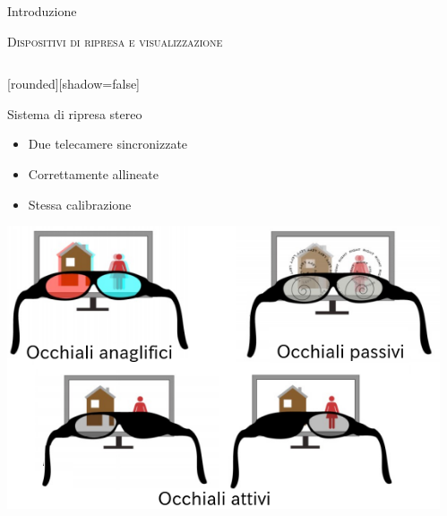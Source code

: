 \documentclass{beamer}
\begin{document}
\begin{section}{Introduzione}
\begin{frame}[t]{\textsc{Dispositivi di ripresa e visualizzazione}}
\begin{columns}
\begin{column}{5cm}
\begin{center}
[rounded][shadow=false]
\begin{block}{Sistema di ripresa stereo}
		\begin{itemize}
			\item  \small{Due telecamere sincronizzate}
			\item \small{Correttamente allineate}
			\item \small{Stessa calibrazione}
		\end{itemize}	
	\end{block}
\end{center}
\centering
\includegraphics[width=1\linewidth]{./img/display.png}
\end{column}

\begin{column}{5cm}


\end{column}
\end{columns}
\end{frame}
\end{section}
\end{document}

